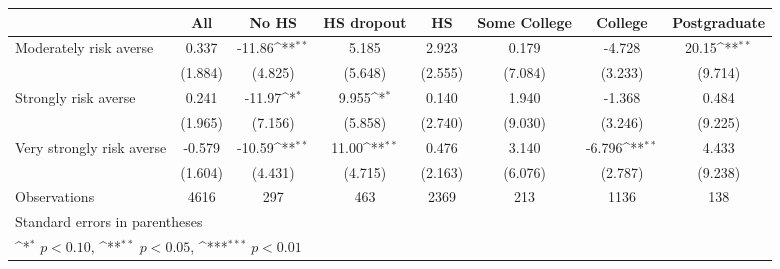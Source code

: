 {
\def\sym#1{\ifmmode^{#1}\else\(^{#1}\)\fi}
\begin{tabular}{l*{7}{c}}
\toprule
                    &\multicolumn{1}{c}{All}&\multicolumn{1}{c}{No HS}&\multicolumn{1}{c}{HS dropout}&\multicolumn{1}{c}{HS}&\multicolumn{1}{c}{Some College}&\multicolumn{1}{c}{College}&\multicolumn{1}{c}{Postgraduate}\\
\midrule
Moderately risk averse&       0.337         &      -11.86\sym{**} &       5.185         &       2.923         &       0.179         &      -4.728         &       20.15\sym{**} \\
                    &     (1.884)         &     (4.825)         &     (5.648)         &     (2.555)         &     (7.084)         &     (3.233)         &     (9.714)         \\
\addlinespace
Strongly risk averse&       0.241         &      -11.97\sym{*}  &       9.955\sym{*}  &       0.140         &       1.940         &      -1.368         &       0.484         \\
                    &     (1.965)         &     (7.156)         &     (5.858)         &     (2.740)         &     (9.030)         &     (3.246)         &     (9.225)         \\
\addlinespace
Very strongly risk averse&      -0.579         &      -10.59\sym{**} &       11.00\sym{**} &       0.476         &       3.140         &      -6.796\sym{**} &       4.433         \\
                    &     (1.604)         &     (4.431)         &     (4.715)         &     (2.163)         &     (6.076)         &     (2.787)         &     (9.238)         \\
\midrule
Observations        &        4616         &         297         &         463         &        2369         &         213         &        1136         &         138         \\
\bottomrule
\multicolumn{8}{l}{\footnotesize Standard errors in parentheses}\\
\multicolumn{8}{l}{\footnotesize \sym{*} \(p<0.10\), \sym{**} \(p<0.05\), \sym{***} \(p<0.01\)}\\
\end{tabular}
}

